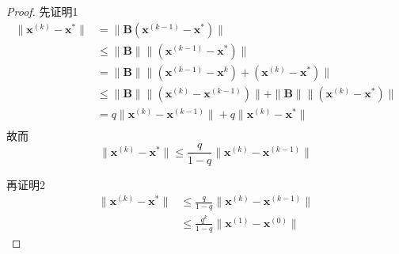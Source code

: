 \begin{proof}
    先证明1
    \[
        \begin{aligned}
            \parallel \boldsymbol{x}^{(k)}-\boldsymbol{x}^{*}\parallel&= \|\boldsymbol{B}(\boldsymbol{x}^{(k-1)}-\boldsymbol{x}^{*})\|\\
            &\leq \|\boldsymbol{B}\|\|(\boldsymbol{x}^{(k-1)}-\boldsymbol{x}^{*})\|\\
            & = \|\boldsymbol{B}\|\|(\boldsymbol{x}^{(k-1)}-\boldsymbol{x}^{k}) + (\boldsymbol{x}^{(k)}-\boldsymbol{x}^{*})\|\\
            & \leq \|\boldsymbol{B}\|\|(\boldsymbol{x}^{(k)}-\boldsymbol{x}^{(k-1)}) \| + \|\boldsymbol{B}\|\| (\boldsymbol{x}^{(k)}-\boldsymbol{x}^{*})\|\\
            & = q\|\boldsymbol{x}^{(k)}-\boldsymbol{x}^{(k-1)} \| + q\| \boldsymbol{x}^{(k)}-\boldsymbol{x}^{*}\|\\
        \end{aligned}  
    \]
    故而
    \[
        \parallel \boldsymbol{x}^{(k)}-\boldsymbol{x}^{*}\parallel\leq\frac{q}{1-q}\parallel \boldsymbol{x}^{(k)}-\boldsymbol{x}^{(k-1)}\parallel 
    \]

    再证明2
    \[
        \begin{aligned}
            \parallel \boldsymbol{x}^{(k)}-\boldsymbol{x}^{*}\parallel&\leq\frac{q}{1-q}\parallel \boldsymbol{x}^{(k)}-\boldsymbol{x}^{(k-1)}\parallel\\
            &\leq \frac{q^k}{1-q}\parallel \boldsymbol{x}^{(1)}-\boldsymbol{x}^{(0)}\parallel
        \end{aligned}
    \]
\end{proof}

